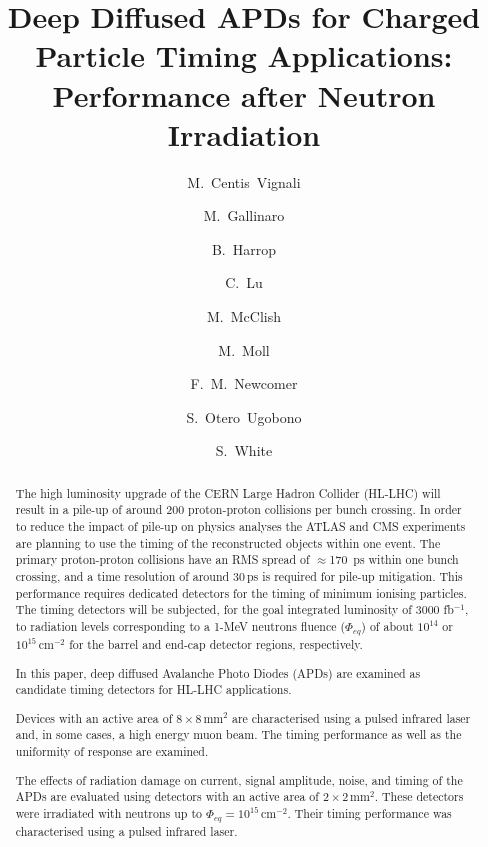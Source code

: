 \documentclass[3p,preprint,twocolumn]{elsarticle}
\begin{document}
\begin{frontmatter}

\title{Deep Diffused APDs for Charged Particle Timing Applications: Performance after Neutron Irradiation}

\author[cern]{M.~Centis~Vignali}

\author[cern,lip]{M.~Gallinaro}
\author[uprinc]{B.~Harrop}
\author[uprinc]{C.~Lu}
\author[rmd]{M.~McClish}
\author[cern]{M.~Moll}
\author[upenn]{F.~M.~Newcomer}
\author[cern,usan]{S.~Otero~Ugobono}
\author[cern,uvirg]{S.~White}

\address[cern]{CERN, Geneva, Switzerland}
\address[lip]{LIP, Lisbon, Portugal}
\address[uprinc]{Princeton University, Princeton, USA}
\address[rmd]{Radiation Monitoring Devices, Watertown, USA}
\address[upenn]{University of Pennsylvania, Philadelphia, USA}
\address[usan]{Universidade de Santiago de Compostela, Santiago de Compostela, Spain}
\address[uvirg]{University of Virginia, Charlottesville, USA}

\begin{abstract}
The high luminosity upgrade of the CERN Large Hadron Collider (HL-LHC) will result in a pile-up of around 200 proton-proton collisions per bunch crossing.
In order to reduce the impact of pile-up on physics analyses the ATLAS and CMS experiments are planning to use the timing of the reconstructed objects within one event.
The primary proton-proton collisions have an RMS spread of $\approx$170~ps within one bunch crossing, and a time resolution of around 30\,ps is required for pile-up mitigation.
This performance requires dedicated detectors for the timing of minimum ionising particles.
The timing detectors will be subjected, for the goal integrated luminosity of 3000 fb$^{-1}$, to radiation levels corresponding to a 1-MeV neutrons fluence ($\Phi_{eq}$) of about $10^{14}$ or $10^{15}$\,cm$^{-2}$ for the barrel and end-cap detector regions, respectively.
  
In this paper, deep diffused Avalanche Photo Diodes (APDs) are examined as candidate timing detectors for HL-LHC applications.

Devices with an active area of $8 \times 8$\,mm$^2$ are characterised using a pulsed infrared laser and, in some cases, a high energy muon beam.
The timing performance as well as the uniformity of response are examined.

The effects of radiation damage on current, signal amplitude, noise, and timing of the APDs are evaluated using detectors with an active area of $2 \times 2$\,mm$^2$.
These detectors were irradiated with neutrons up to $\Phi_{eq} = 10^{15}$\,cm$^{-2}$.
Their timing performance was characterised using a pulsed infrared laser.


\end{abstract}

\end{frontmatter}
\end{document}
